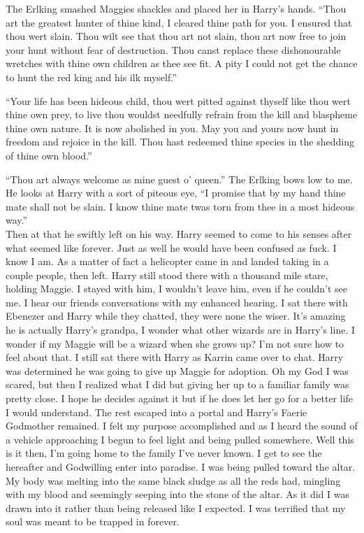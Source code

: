 	The Erlking smashed Maggies shackles and placed her in Harry's hands. ``Thou art the greatest hunter of thine kind, I cleared thine path for you. I ensured that thou wert slain. Thou wilt see that thou art not slain, thou art now free to join your hunt without fear of destruction. Thou canst replace these dishonourable wretches with thine own children as thee see fit. A pity I could not get the chance to hunt the red king and his ilk myself.''
	
	``Your life has been hideous child, thou wert pitted against thyself like thou wert thine own prey, to live thou wouldst needfully refrain from the kill and blaspheme thine own nature. It is now abolished in you. May you and yours now hunt in freedom and rejoice in the kill. Thou hast redeemed thine species in the shedding of thine own blood.''
	
	``Thou art always welcome as mine guest o' queen.'' The Erlking bows low to me. He looks at Harry with a sort of piteous eye, ``I promise that by my hand thine mate shall not be slain. I know thine mate twas torn from thee in a most hideous way.''\\

Then at that he swiftly left on his way. Harry seemed to come to his senses after what seemed like forever. Just as well he would have been confused as fuck. I know I am.  As a matter of fact a helicopter came in and landed taking in a couple people, then left. Harry still stood there with a thousand mile stare, holding Maggie. I stayed with him, I wouldn't leave him, even if he couldn't see me. I hear our friends conversations with my enhanced hearing. I sat there with Ebenezer and Harry while they chatted, they were none the wiser. It's amazing he is actually Harry's grandpa, I wonder what other wizards are in Harry's line. I wonder if my Maggie will be a wizard when she grows up? I'm not sure how to feel about that. I still sat there with Harry as Karrin came over to chat. Harry was determined he was going to give up Maggie for adoption. Oh my God I was scared, but then I realized what I did but giving her up to a familiar family was pretty close. I hope he decides against it but if he does let her go for a better life I would understand. The rest escaped into a portal and Harry's Faerie Godmother remained. I felt my purpose accomplished and as I heard the sound of a vehicle approaching I begun to feel light and being pulled somewhere. Well this is it then, I'm going home to the family I've never known. I get to see the hereafter and Godwilling enter into paradise. I was being pulled toward the altar. My body was melting into the same black sludge as all the reds had, mingling with my blood and seemingly seeping into the stone of the altar. As it did I was drawn into it rather than being released like I expected. I was terrified that my soul was meant to be trapped in \chichenitza\: forever.\\

